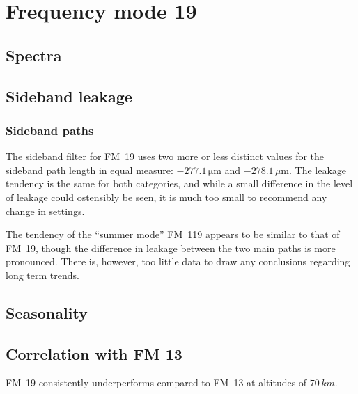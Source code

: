 \section{Frequency mode 19}
\subsection{Spectra}

\subsection{Sideband leakage}
\subsubsection{Sideband paths}
The sideband filter for FM~19 uses two more or less distinct values for the
sideband path length in equal measure: $-277.1\,\mathrm{\mu m}$ and
$-278.1\,\mu\mathrm{m}$.
The leakage tendency is the same for both categories, and while a small
difference in the level of leakage could ostensibly be seen, it is much too
small to recommend any change in settings.

The tendency of the ``summer mode'' FM~119 appears to be similar to that of
FM~19, though the difference in leakage between the two main paths is more
pronounced.
There is, however, too little data to draw any conclusions
regarding long term trends.

\subsection{Seasonality}

\subsection{Correlation with FM 13}
FM~19 consistently underperforms compared to FM~13 at altitudes of $70\,km$.
